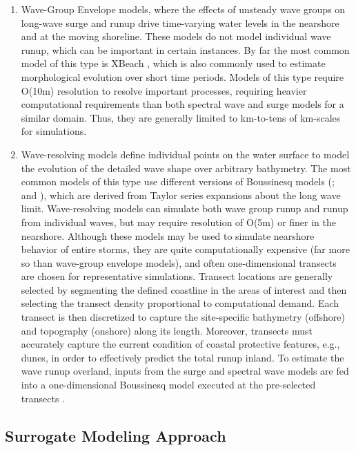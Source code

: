 \begin{enumerate}
    \item Wave-Group Envelope models, where the effects of unsteady wave groups on long-wave surge and runup drive time-varying water levels in the nearshore and at the moving shoreline. These models do not model individual wave runup, which can be important in certain instances. By far the most common model of this type is XBeach \citep{roelvink2009modelling}, which is also commonly used to estimate morphological evolution over short time periods. Models of this type require O(10m) resolution to resolve important processes, requiring heavier computational requirements than both spectral wave and surge models for a similar domain. Thus, they are generally limited to km-to-tens of km-scales for simulations.
    
    \vspace{2mm}
    
    \item Wave-resolving models define individual points on the water surface to model the evolution of the detailed wave shape over arbitrary bathymetry. The most common models of this type use different versions of Boussinesq models (\cite{lynett2002modeling,kennedy2000boussinesq}; and \cite{nwogu2010infragravity}), which are derived from Taylor series expansions about the long wave limit. Wave-resolving models can simulate both wave group runup and runup from individual waves, but may require resolution of O(5m) or finer in the nearshore. Although these models may be used to simulate nearshore behavior of entire storms, they are quite computationally expensive (far more so than wave-group envelope models), and often one-dimensional transects are chosen for representative simulations. Transect locations are generally selected by segmenting the defined coastline in the areas of interest and then selecting the transect density proportional to computational demand. Each transect is then discretized to capture the site-specific bathymetry (offshore) and topography (onshore) along its length. Moreover, transects must accurately capture the current condition of coastal protective features, e.g., dunes, in order to effectively predict the total runup inland. To estimate the wave runup overland, inputs from the surge and spectral wave models are fed into a one-dimensional Boussinesq model executed at the pre-selected transects  \citep{demirbilek2009wave}. 
\end{enumerate}

\subsection{Surrogate Modeling Approach}


